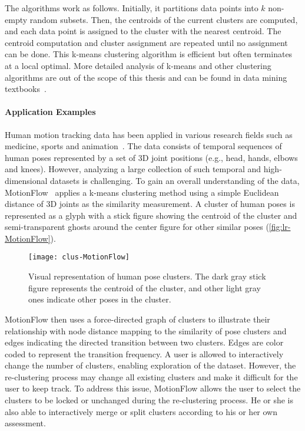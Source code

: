 The algorithms work as follows. Initially, it partitions data points into $k$ non-empty random subsets. Then, the centroids of the current clusters are computed, and each data point is assigned to the cluster with the nearest centroid. The centroid computation and cluster assignment are repeated until no assignment can be done. This k-means clustering algorithm is efficient but often terminates at a local optimal. More detailed analysis of k-means and other clustering algorithms are out of the scope of this thesis and can be found in data mining textbooks~\cite{Tan2006,Han2011}.

\paragraph{Application Examples}
Human motion tracking data has been applied in various research fields such as medicine, sports and animation~\cite{Bernard2013}. The data consists of temporal sequences of human poses represented by a set of 3D joint positions (e.g., head, hands, elbows and knees). However, analyzing a large collection of such temporal and high-dimensional datasets is challenging. To gain an overall understanding of the data, MotionFlow~\cite{Jang2016} applies a k-means clustering method using a simple Euclidean distance of 3D joints as the similarity measurement. A cluster of human poses is represented as a glyph with a stick figure showing the centroid of the cluster and semi-transparent ghosts around the center figure for other similar poses (\autoref{fig:lr-MotionFlow}).

\begin{figure}[!htb]
	\centering
	\texttt{[image: clus-MotionFlow]}
	\caption[Visual representation of human pose clusters]{Visual representation of human pose clusters. The dark gray stick figure represents the centroid of the cluster, and other light gray ones indicate other poses in the cluster. }
	\label{fig:lr-MotionFlow}
\end{figure}

MotionFlow then uses a force-directed graph of clusters to illustrate their relationship with node distance mapping to the similarity of pose clusters and edges indicating the directed transition between two clusters. Edges are color coded to represent the transition frequency. A user is allowed to interactively change the number of clusters, enabling exploration of the dataset. However, the re-clustering process may change all existing clusters and make it difficult for the user to keep track. To address this issue, MotionFlow allows the user to select the clusters to be locked or unchanged during the re-clustering process. He or she is also able to interactively merge or split clusters according to his or her own assessment.

